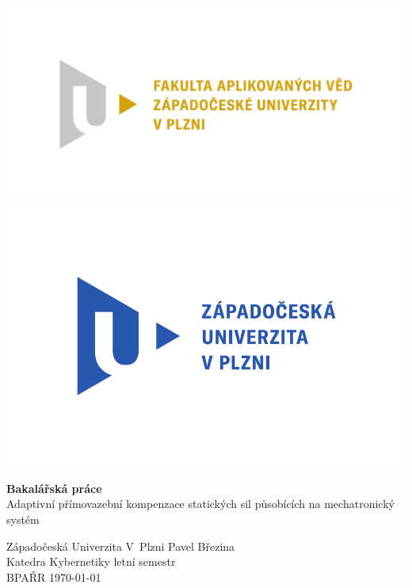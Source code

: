 \begin{center}
    \includegraphics[height=0.21\textheight]{Img/FAV_logo.pdf}
    \includegraphics[height=0.21\textheight]{Img/zcu-logo.pdf}
\end{center}
\begin{center}
    \vspace{3cm}
    \textbf{\LARGE{Bakalářská práce}}\\
    \Large{Adaptivní přímovazební kompenzace statických sil působících na mechatronický systém}
\end{center}
\vfill{}
\noindent
Západočeská Univerzita V~Plzni \hfill Pavel Březina\\
Katedra Kybernetiky            \hfill letní semestr\\
BPAŘR             \hfill \today
\thispagestyle{empty}
\newpage